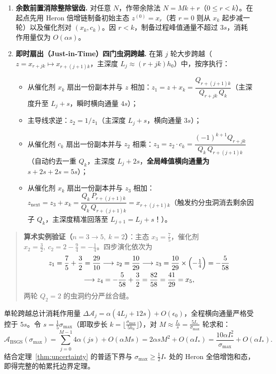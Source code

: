 \documentclass[11pt,a4paper]{ctexart}
\theoremstyle{plain}
\theoremstyle{definition}
\newcommand{\cA}{\mathcal{A}}
\begin{document}
\begin{enumerate}
\item \textbf{余数前置消除整除锯齿.} 对任意 $N$，作带余除法 $N = M k + r$（$0 \le r < k$）。在起点先用 Heron 倍增链制备初始主态 $z^{(0)} = x_r$（若 $r=0$ 则从 $x_k$ 起步减一轮）以及催化剂对 $(x_k, c_k)$。因 $r < k$，制备过程峰值通量不超过 $3s$，消耗作用量仅为 $O(\alpha s)$。

\item \textbf{即时扇出（Just-in-Time）四门虫洞跨越.} 在第 $j$ 轮大步跨越（$z = x_{r+jk} \mapsto x_{r+(j+1)k}$，主深度 $L_j \approx (r+jk)h_0$）中，按序执行：
\begin{itemize}
\item 从催化剂 $x_k$ 扇出一份副本并与 $z$ 相加：$z_1 = z + x_k = \dfrac{Q_{r+(j+1)k}}{Q_{r+jk}\, Q_k}$（主深度升至 $L_j + s$，瞬时横向通量 $4s$）；
\item 主导线求逆：$z_2 = 1 / z_1$（主深度 $L_j + s$，横向通量 $3s$）；
\item 从催化剂 $c_k$ 扇出一份副本并与 $z_2$ 相乘：$z_3 = z_2 \cdot c_k = \dfrac{(-1)^{k+1} Q_{r+jk}}{Q_k\, Q_{r+(j+1)k}}$（自动约去一重 $Q_k$，主深度 $L_j + 2s$，\textbf{全局峰值横向通量为 $s + 2s + 2s = 5s$}）；
\item 从催化剂 $x_k$ 扇出一份副本并与 $z_3$ 相加：$z_{\mathrm{next}} = z_3 + x_k = \dfrac{Q_k\, P_{r+(j+1)k}}{Q_k\, Q_{r+(j+1)k}} = x_{r+(j+1)k}$（触发约分虫洞消去剩余因子 $Q_k$，主深度精准回落至 $L_{j+1} = L_j + s$！）。
\end{itemize}
\end{enumerate}

\begin{quote}
\small
\textbf{算术实例验证（$n=3 \to 5,\ k=2$）}：主态 $x_3 = \frac{7}{5}$，催化剂 $x_2 = \frac{3}{2},\ c_2 = 2 - \frac{9}{4} = -\frac{1}{4}$。四步演化依次为
\[
\begin{gathered}
z_1 = \frac{7}{5} + \frac{3}{2} = \frac{29}{10}
\longrightarrow z_2 = \frac{10}{29}
\longrightarrow z_3 = \frac{10}{29}\times\Bigl(-\tfrac{1}{4}\Bigr) = -\frac{5}{58} \\
\longrightarrow z_4 = -\frac{5}{58} + \frac{3}{2} = \frac{82}{58} = \frac{41}{29} = x_5,
\end{gathered}
\]
两轮 $Q_2 = 2$ 的虫洞约分严丝合缝。
\end{quote}

单轮跨越总计消耗作用量 $\Delta \cA_j = \alpha(4 L_j + 12s) + O(\epsilon_0)$，全程横向通量严格受控于 $5s$。令 $s = \frac{1}{5}\sigma_{\max}$（即取步长 $k = \lfloor \frac{\sigma_{\max}}{5 h_0} \rfloor$），对 $M \approx \frac{I_*}{s} = \frac{5 I_*}{\sigma_{\max}}$ 轮求和：
\[
\cA_{\mathrm{BSGS}}(\sigma_{\max}) = \sum_{j=0}^{M-1} 4\alpha (j s) + O(\alpha M s) = 2\alpha s M^2 + O(\alpha I_*) = \frac{10\alpha I_*^2}{\sigma_{\max}} + O(\alpha I_*).
\]
结合定理~\ref{thm:uncertainty} 的普适下界与 $\sigma_{\max} \ge \frac{1}{2}I_*$ 处的 Heron 全倍增饱和态，即得完整的帕累托边界定理。
\end{document}
